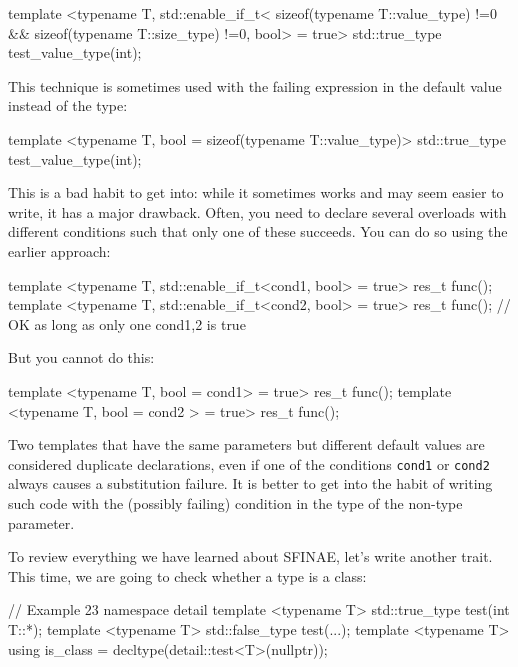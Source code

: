 \begin{code}
template <typename T, std::enable_if_t<
  sizeof(typename T::value_type) !=0 &&
  sizeof(typename T::size_type) !=0, bool> = true>
std::true_type test_value_type(int);
\end{code}

This technique is sometimes used with the failing expression in the default value instead of the type:

\begin{code}
template <typename T,
          bool = sizeof(typename T::value_type)>
std::true_type test_value_type(int);
\end{code}

This is a bad habit to get into: while it sometimes works and may seem easier to write, it has a major drawback. Often, you need to declare several overloads with different conditions such that only one of these succeeds. You can do so using the earlier approach:

\begin{code}
template <typename T, std::enable_if_t<cond1, bool> = true>
res_t func();
template <typename T, std::enable_if_t<cond2, bool> = true>
res_t func(); // OK as long as only one cond1,2 is true
\end{code}

But you cannot do this:

\begin{code}
template <typename T, bool = cond1> = true>
res_t func();
template <typename T, bool = cond2 > = true>
res_t func();
\end{code}

Two templates that have the same parameters but different default values are considered duplicate declarations, even if one of the conditions \texttt{cond1} or \texttt{cond2} always causes a substitution failure. It is better to get into the habit of writing such code with the (possibly failing) condition in the type of the non-type parameter.

To review everything we have learned about SFINAE, let's write another trait. This time, we are going to check whether a type is a class:

\begin{code}
// Example 23
namespace detail {
template <typename T> std::true_type test(int T::*);
template <typename T> std::false_type test(...);
}
template <typename T>
using is_class = decltype(detail::test<T>(nullptr));
\end{code}

